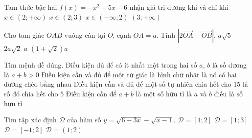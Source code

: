 \begin{ex}%
	Tam thức bậc hai $f(x)=-x^2+5x-6$ nhận giá trị dương khi và chỉ khi
	\choice
	{$x\in (2;+\infty)$}
	{\True $x\in (2;3)$}
	{$x\in (-\infty; 2)$}
	{$(3;+\infty)$}
\end{ex}
\begin{ex}%
	Cho tam giác $OAB$ vuông cân tại $O$, cạnh $OA=a$. Tính $|2\overrightarrow{OA}-\overrightarrow{OB}|$.
	\choice
	{\True $a\sqrt{5}$}
	{$2a\sqrt{2}$}
	{$a$}
	{$(1+\sqrt{2})a$}
\end{ex}
\begin{ex}%
	Tìm mệnh đề đúng.
	\choice
	{\True Điều kiện đủ để có ít nhất một trong hai số $a$, $b$ là số dương là $a+b>0$}
	{Điều kiện cần và đủ để một tứ giác là hình chữ nhật là nó có hai đường chéo bằng nhau}
	{Điều kiện cần và đủ để một số tự nhiên chia hết cho $15$ là số đó chia hết cho $5$}
	{Điều kiện cần để $a+b$ là một số hữu tỉ là $a$ và $b$ điều là số hữu tỉ}
\end{ex}
\begin{ex}%
	Tìm tập xác định $\mathscr{D}$ của hàm số $y=\sqrt{6-3x}-\sqrt{x-1}$.
	\choice
	{$\mathscr{D}=[1;2]$}
	{\True $\mathscr{D}=[1;3]$}
	{$\mathscr{D}=[-1;2]$}
	{$\mathscr{D}=(1;2)$}
\end{ex}

